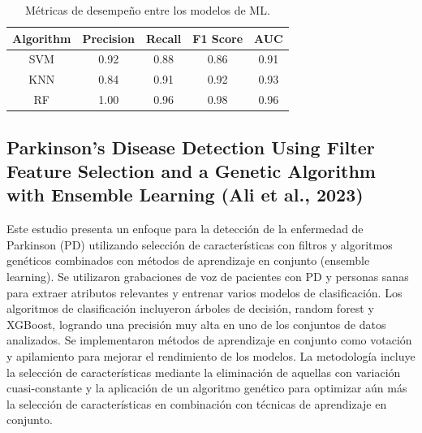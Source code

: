 \documentclass[listof=nochaptergap,12pt,times,authoryear]{report}
\begin{document}
\begin{table}[H]
\centering
\caption{Métricas de desempeño entre los modelos de ML.}
\label{table:metrics_ml}
\begin{tabular}{|c|c|c|c|c|}
\hline
\textbf{Algorithm} & \textbf{Precision} & \textbf{Recall} & \textbf{F1 Score} & \textbf{AUC} \\ \hline
SVM                & 0.92               & 0.88            & 0.86              & 0.91         \\ \hline
KNN                & 0.84               & 0.91            & 0.92              & 0.93         \\ \hline
RF                 & 1.00               & 0.96            & 0.98              & 0.96         \\ \hline
\end{tabular}
\end{table}




\subsection{Parkinson’s Disease Detection Using Filter Feature Selection and a Genetic Algorithm with Ensemble Learning (Ali et al., 2023)}


Este estudio presenta un enfoque para la detección de la enfermedad de Parkinson (PD) utilizando selección de características con filtros y algoritmos genéticos combinados con métodos de aprendizaje en conjunto (ensemble learning). Se utilizaron grabaciones de voz de pacientes con PD y personas sanas para extraer atributos relevantes y entrenar varios modelos de clasificación. Los algoritmos de clasificación incluyeron árboles de decisión, random forest y XGBoost, logrando una precisión muy alta en uno de los conjuntos de datos analizados. Se implementaron métodos de aprendizaje en conjunto como votación y apilamiento para mejorar el rendimiento de los modelos.
 La metodología incluye la selección de características mediante la eliminación de aquellas con variación cuasi-constante y la aplicación de un algoritmo genético para optimizar aún más la selección de características en combinación con técnicas de aprendizaje en conjunto.
\end{document}
